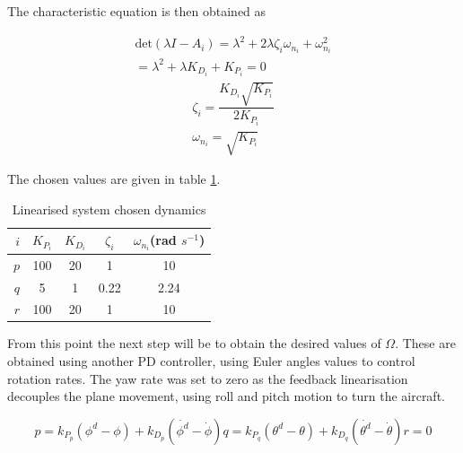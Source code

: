 The characteristic equation is then obtained as 

\begin{equation}
\begin{split}
\text{det}(\lambda I-A_i)= \lambda^2 + 2\lambda\zeta_i \omega_{n_i} +  \omega_{n_i}^2\\ = \lambda^2 + \lambda K_{D_i} + K_{P_i} = 0
\end{split}
\end{equation}
\begin{gather}
\zeta_i = \dfrac{K_{D_i}\sqrt{K_{P_i}}}{2K_{P_i}}\\
\omega_{n_i}=\sqrt{K_{P_i}}
\end{gather}

The chosen values are given in table \ref{tab:tau_dynamics}.

\begin{table}[htbp]
  \centering
  \caption[Linearised system chosen dynamics]{Linearised system chosen dynamics}
    \begin{tabular}{rcccc}
    \toprule
    $i$   & $K_{P_i}$ & $K_{D_i}$ & $\zeta_i$ & $\omega_{n_i}$(rad $s^{-1}$) \\
    \midrule
    $p$   & 100   & 20    & 1     & 10 \\
    $q$   & 5     & 1     & 0.22 & 2.24 \\
    $r$   & 100   & 20    & 1     & 10 \\
    \bottomrule
    \end{tabular}%
  \label{tab:tau_dynamics}%
\end{table}%


From this point the next step will be to obtain the desired values of $\Omega$. These are obtained using another PD controller, using Euler angles values to control rotation rates. The yaw rate was set to zero as the feedback linearisation decouples the plane movement, using roll and pitch motion to turn the aircraft.

\begin{subequations}
\begin{equation}
p= k_{P_p} (\phi^d-\phi) + k_{D_p} (\dot{\phi^d}-\dot{\phi})
\end{equation}
\begin{equation}
q= k_{P_q} (\theta^d-\theta) + k_{D_q} (\dot{\theta^d}-\dot{\theta})
\end{equation}
\begin{equation}
r=0
\end{equation}
\label{eq:omega_PD}
\end{subequations}

